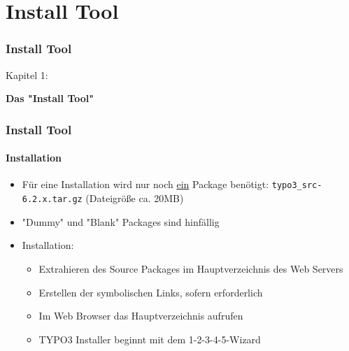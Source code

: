 %

\section{Install Tool}
\begin{frame}[fragile]
	\frametitle{Install Tool}

	\begin{center}\huge{Kapitel 1:}\end{center}
	\begin{center}\huge{\color{typo3darkgrey}\textbf{Das "Install Tool"}}\end{center}

\end{frame}


\begin{frame}[fragile]
	\frametitle{Install Tool}
	\framesubtitle{Installation}

	\begin{itemize}
		\item Für eine Installation wird nur noch \underline{ein} Package benötigt:\newline
				\texttt{typo3\_src-6.2.x.tar.gz} (Dateigröße ca. 20MB)
		\item "Dummy" und "Blank" Packages sind hinfällig
		\item Installation:
			\begin{itemize}
				\item Extrahieren des Source Packages im Hauptverzeichnis des Web Servers
				\item Erstellen der symbolischen Links, sofern erforderlich
				\item Im Web Browser das Hauptverzeichnis aufrufen
				\item TYPO3 Installer beginnt mit dem 1-2-3-4-5-Wizard
			\end{itemize}

	\end{itemize}

\end{frame}

